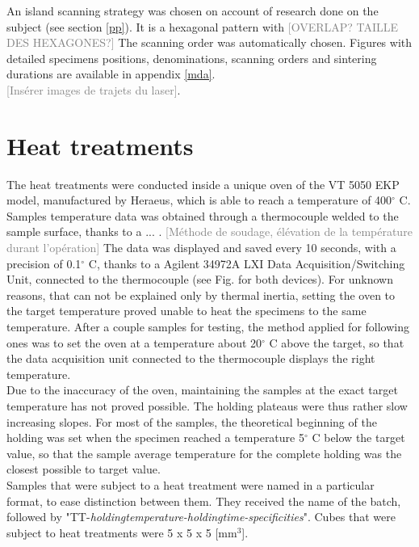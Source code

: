 An island scanning strategy was chosen on account of research done on the subject (see section \ref{pp}). It is a hexagonal pattern with \textcolor{gray}{[OVERLAP? TAILLE DES HEXAGONES?]} The scanning order was automatically chosen. Figures with detailed specimens positions, denominations, scanning orders and sintering durations are available in appendix \ref{mda}.\\

\textcolor{gray}{[Insérer images de trajets du laser]}.\\



\section{Heat treatments}
\label{MMHT}
The heat treatments were conducted inside a unique oven of the VT 5050 EKP model, manufactured by Heraeus, which is able to reach a temperature of 400$^\circ$ C. Samples temperature data was obtained through a thermocouple welded to the sample surface, thanks to a ... . \textcolor{gray}{[Méthode de soudage, élévation de la température durant l'opération]} The data was displayed and saved every 10 seconds, with a precision of 0.1$^\circ$ C, thanks to a Agilent 34972A LXI Data Acquisition/Switching Unit, connected to the thermocouple (see Fig. for both devices). For unknown reasons, that can not be explained only by thermal inertia, setting the oven to the target temperature proved unable to heat the specimens to the same temperature. After a couple samples for testing, the method applied for following ones was to set the oven at a temperature about 20$^\circ$ C above the target, so that the data acquisition unit connected to the thermocouple displays the right temperature.\\

Due to the inaccuracy of the oven, maintaining the samples at the exact target temperature has not proved possible. The holding plateaus were thus rather slow increasing slopes. For most of the samples, the theoretical beginning of the holding was set when the specimen reached a temperature 5$^\circ$ C below the target value, so that the sample average temperature for the complete holding was the closest possible to target value.\\

Samples that were subject to a heat treatment were named in a particular format, to ease distinction between them. They received the name of the batch, followed by "TT-\textit{holdingtemperature-holdingtime-specificities}". Cubes that were subject to heat treatments were 5 x 5 x 5 [mm$^3$].

